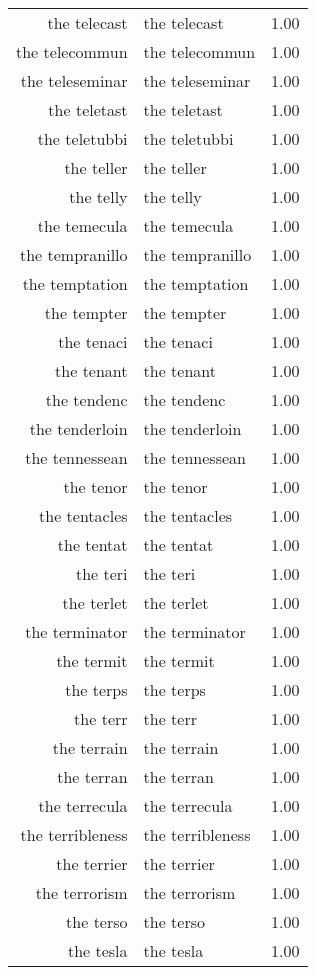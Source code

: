 \begin{table}[ht]
\begin{tabular}{rlr}
  the telecast & the telecast & 1.00 \\ 
  the telecommun & the telecommun & 1.00 \\ 
  the teleseminar & the teleseminar & 1.00 \\ 
  the teletast & the teletast & 1.00 \\ 
  the teletubbi & the teletubbi & 1.00 \\ 
  the teller & the teller & 1.00 \\ 
  the telly & the telly & 1.00 \\ 
  the temecula & the temecula & 1.00 \\ 
  the tempranillo & the tempranillo & 1.00 \\ 
  the temptation & the temptation & 1.00 \\ 
  the tempter & the tempter & 1.00 \\ 
  the tenaci & the tenaci & 1.00 \\ 
  the tenant & the tenant & 1.00 \\ 
  the tendenc & the tendenc & 1.00 \\ 
  the tenderloin & the tenderloin & 1.00 \\ 
  the tennessean & the tennessean & 1.00 \\ 
  the tenor & the tenor & 1.00 \\ 
  the tentacles & the tentacles & 1.00 \\ 
  the tentat & the tentat & 1.00 \\ 
  the teri & the teri & 1.00 \\ 
  the terlet & the terlet & 1.00 \\ 
  the terminator & the terminator & 1.00 \\ 
  the termit & the termit & 1.00 \\ 
  the terps & the terps & 1.00 \\ 
  the terr & the terr & 1.00 \\ 
  the terrain & the terrain & 1.00 \\ 
  the terran & the terran & 1.00 \\ 
  the terrecula & the terrecula & 1.00 \\ 
  the terribleness & the terribleness & 1.00 \\ 
  the terrier & the terrier & 1.00 \\ 
  the terrorism & the terrorism & 1.00 \\ 
  the terso & the terso & 1.00 \\ 
  the tesla & the tesla & 1.00 \\ 

\end{tabular}
\end{table}
